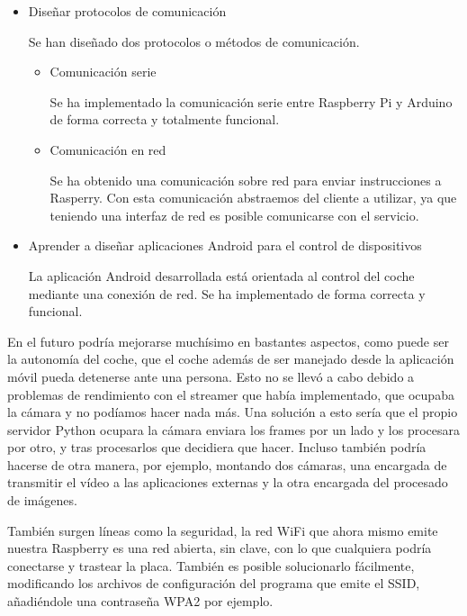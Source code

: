 \documentclass{pclass}
\begin{document}
\begin{itemize}
		\clearpage
		\item Diseñar protocolos de comunicación
		
			Se han diseñado dos protocolos o métodos de comunicación.
				\begin{itemize}
					\item Comunicación serie
					
						Se ha implementado la comunicación serie entre Raspberry Pi y Arduino de forma correcta y totalmente funcional.
						
					\item Comunicación en red
					
						Se ha obtenido una comunicación sobre red para enviar instrucciones a Rasperry. Con esta comunicación abstraemos del cliente a utilizar, ya que teniendo una interfaz de red es posible comunicarse con el servicio.
					
				\end{itemize}
			
			\item Aprender a diseñar aplicaciones Android para el control de dispositivos
			
				La aplicación Android desarrollada está orientada al control del coche mediante una conexión de red. Se ha implementado de forma correcta y funcional.
	\end{itemize}
	
	


	En el futuro podría mejorarse muchísimo en bastantes aspectos, como puede ser la autonomía del coche, que el coche además de ser manejado desde la aplicación móvil pueda detenerse ante una persona. Esto no se llevó a cabo debido a problemas de rendimiento con el streamer que había implementado, que ocupaba la cámara y no podíamos hacer nada más. Una solución a esto sería que el propio servidor Python ocupara la cámara enviara los frames por un lado y los procesara por otro, y tras procesarlos que decidiera que hacer.
	Incluso también podría hacerse de otra manera, por ejemplo, montando dos cámaras, una encargada de transmitir el vídeo a las aplicaciones externas y la otra encargada del procesado de imágenes.
	
	También surgen líneas como la seguridad, la red WiFi que ahora mismo emite nuestra Raspberry es una red abierta, sin clave, con lo que cualquiera podría conectarse y trastear la placa. También es posible solucionarlo fácilmente, modificando los archivos de configuración del programa que emite el SSID, añadiéndole una contraseña WPA2 por ejemplo.
	
\end{document}
